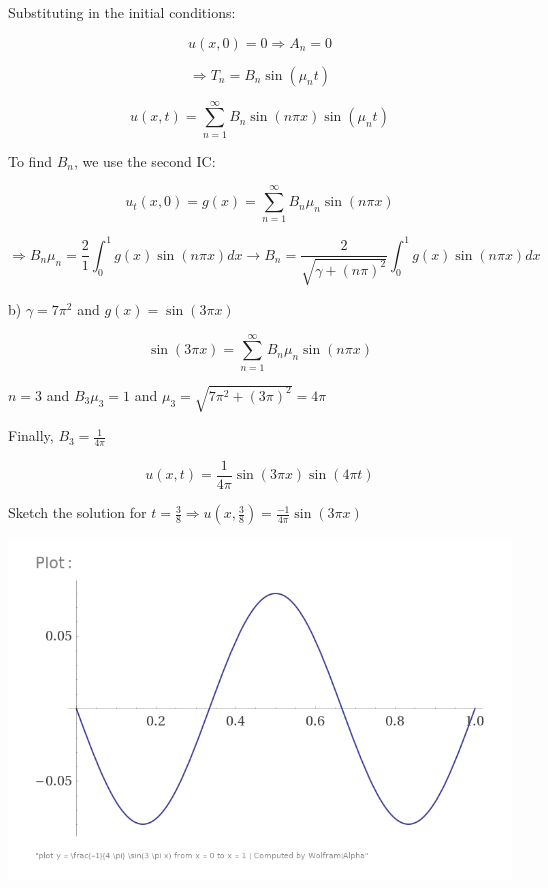 \documentclass{article}
\begin{document}
Substituting in the initial conditions:

$$u(x,0) = 0 \Rightarrow A_n = 0$$

$$\Rightarrow T_n = B_n \sin(\mu_n t)$$

$$u(x,t) = \sum_{n=1}^\infty B_n \sin(n \pi x) \sin(\mu_n t)$$

To find $B_n$, we use the second IC:

$$u_t(x,0) = g(x) = \sum_{n=1}^\infty B_n \mu_n \sin(n \pi x)$$

$$\Rightarrow B_n \mu_n = \frac{2}{1} \int_0^1 g(x) \sin(n \pi x) dx \rightarrow B_n = \frac{2}{\sqrt{\gamma + (n \pi)^2}} \int_0^1 g(x) \sin(n \pi x) dx$$

b) $\gamma = 7 \pi^2$ and $g(x) = \sin(3 \pi x)$

$$\sin(3 \pi x) = \sum_{n=1}^\infty B_n \mu_n \sin(n \pi x)$$

$n = 3$ and $B_3 \mu_3 = 1$ and $\mu_3 = \sqrt{7 \pi^2 + (3 \pi)^2} = 4 \pi$

Finally, $B_3 = \frac{1}{4 \pi}$

$$u(x,t) = \frac{1}{4 \pi} \sin(3 \pi x) \sin(4 \pi t)$$

\hfill

Sketch the solution for $t = \frac{3}{8} \Rightarrow u(x, \frac{3}{8}) = \frac{-1}{4 \pi} \sin(3 \pi x)$

\begin{center}
    \includegraphics[width = 0.8 \textwidth]{12.png}
\end{center}
\end{document}
